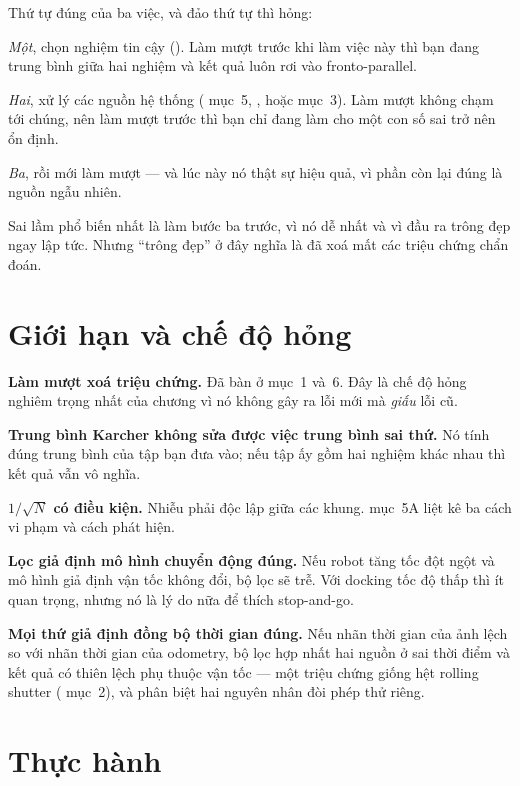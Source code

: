 \documentclass[../../marker.tex]{subfiles}
\begin{document}
\begin{cannho}
Thứ tự đúng của ba việc, và đảo thứ tự thì hỏng:

\emph{Một}, chọn nghiệm tin cậy (). Làm mượt trước khi làm việc này thì bạn đang trung bình giữa hai nghiệm và kết quả luôn rơi vào fronto-parallel.

\emph{Hai}, xử lý các nguồn hệ thống ( mục~5, , hoặc  mục~3). Làm mượt không chạm tới chúng, nên làm mượt trước thì bạn chỉ đang làm cho một con số sai trở nên ổn định.

\emph{Ba}, rồi mới làm mượt --- và lúc này nó thật sự hiệu quả, vì phần còn lại đúng là nguồn ngẫu nhiên.

Sai lầm phổ biến nhất là làm bước ba trước, vì nó dễ nhất và vì đầu ra trông đẹp ngay lập tức. Nhưng ``trông đẹp'' ở đây nghĩa là đã xoá mất các triệu chứng chẩn đoán.
\end{cannho}

\section{Giới hạn và chế độ hỏng}

\textbf{Làm mượt xoá triệu chứng.} Đã bàn ở mục~1 và~6. Đây là chế độ hỏng nghiêm trọng nhất của chương vì nó không gây ra lỗi mới mà \emph{giấu} lỗi cũ.

\textbf{Trung bình Karcher không sửa được việc trung bình sai thứ.} Nó tính đúng trung bình của tập bạn đưa vào; nếu tập ấy gồm hai nghiệm khác nhau thì kết quả vẫn vô nghĩa.

\textbf{\(1/\sqrt{N}\) có điều kiện.} Nhiễu phải độc lập giữa các khung.  mục~5A liệt kê ba cách vi phạm và cách phát hiện.

\textbf{Lọc giả định mô hình chuyển động đúng.} Nếu robot tăng tốc đột ngột và mô hình giả định vận tốc không đổi, bộ lọc sẽ trễ. Với docking tốc độ thấp thì ít quan trọng, nhưng nó là lý do nữa để thích stop-and-go.

\textbf{Mọi thứ giả định đồng bộ thời gian đúng.} Nếu nhãn thời gian của ảnh lệch so với nhãn thời gian của odometry, bộ lọc hợp nhất hai nguồn ở sai thời điểm và kết quả có thiên lệch phụ thuộc vận tốc --- một triệu chứng giống hệt rolling shutter ( mục~2), và phân biệt hai nguyên nhân đòi phép thử riêng.

\section{Thực hành}
\end{document}
